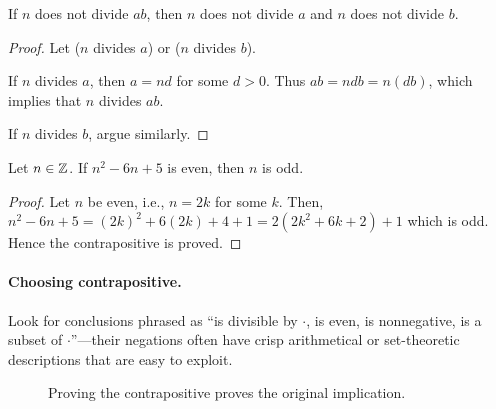 \begin{theorem}
If $n$ does not divide $ab$, then $n$ does not divide $a$ and $n$ does not divide $b$.
\end{theorem}
\begin{proof}
Let ($n$ divides $a$) or ($n$ divides $b$). 

If $n$ divides $a$, then $a = nd$ for some $d > 0$. Thus $ab = ndb = n(db)$, which implies that $n$ divides $ab$.

If  $n$ divides $b$, argue similarly.

\end{proof}

\begin{theorem}
Let $n \in \mathbb{Z}$. If $n^2 - 6n + 5$ is even, then $n$ is odd.
\end{theorem}
\begin{proof}
Let $n$ be even, i.e., $n = 2k$ for some $k$. Then, $n^2 - 6n + 5 = (2k)^2 + 6(2k) + 4 + 1 =  2 (2k^2 + 6k +2 ) + 1$ which is odd. Hence the contrapositive is proved.
\end{proof}

\paragraph{Choosing contrapositive.}
Look for conclusions phrased as “is divisible by \(\cdot\), is even, is nonnegative, is a subset of \(\cdot\)”—their negations often have crisp arithmetical or set-theoretic descriptions that are easy to exploit.

\begin{figure}[h]
\centering
{}
\caption{Proving the contrapositive proves the original implication.}
\end{figure}



